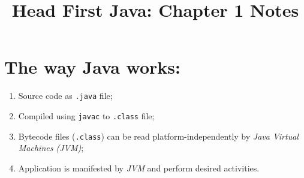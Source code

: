 \documentclass{tufte-handout}
\title{Head First Java: Chapter 1 Notes}
\begin{document}
    
    \maketitle

    \section*{The way Java works:}
    \begin{enumerate}
        \item Source code as \texttt{.java} file;
        \item Compiled using \texttt{javac} to \texttt{.class} file;
        \item Bytecode files (\texttt{.class}) can be read platform-independently by \emph{Java Virtual Machines (JVM)};
        \item Application is manifested by \emph{JVM} and perform desired activities.
    \end{enumerate}
\end{document}

